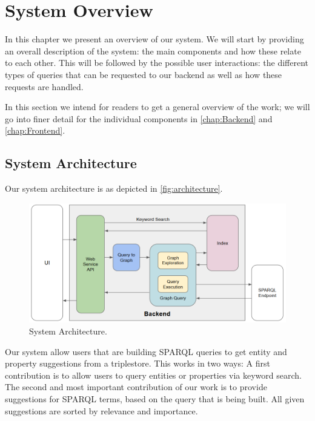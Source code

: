 \chapter{System Overview}
\label{chap:overview}

In this chapter we present an overview of our system. 
We will start by providing an overall description of the system: 
the main components and how these relate to each other. 
This will be followed by the possible user interactions: 
the different types of queries that can be requested to our backend as well as how these requests are handled.

In this section we intend for readers to get a general overview of the work; we will go into finer detail for the individual components in \autoref{chap:Backend} and \autoref{chap:Frontend}.

\section{System Architecture}

Our system architecture is as depicted in \autoref{fig:architecture}.

\begin{figure}[H]
    \centering
        \includegraphics[width=\linewidth]{imagenes/architecture.png}
        \caption{System Architecture.}
        \label{fig:architecture}
\end{figure}

Our system allow users that are building SPARQL queries to get entity and property suggestions from a triplestore. 
This works in two ways: 
A first contribution is to allow users to query entities or properties via keyword search. 
The second and most important contribution of our work is to provide suggestions for SPARQL terms, based on the query that is being built. 
All given suggestions are sorted by relevance and importance.

